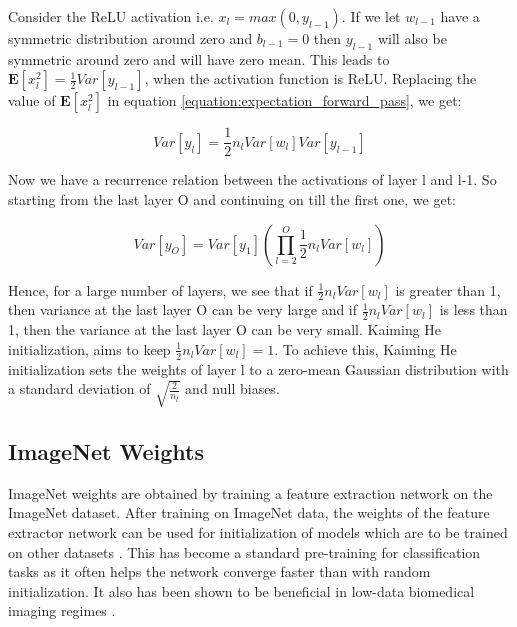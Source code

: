 Consider the ReLU activation i.e. $x_l = max(0, y_{l-1})$. If we let $w_{l-1}$ have a symmetric distribution around zero and $b_{l-1} = 0$ then $y_{l-1}$ will also be symmetric around zero and will have zero mean. This leads to $\mathbf{E}[x_l^2] = \frac{1}{2}Var[y_{l-1}]$, when the activation function is ReLU. Replacing the value of $\mathbf{E}[x_l^2]$ in equation \ref{equation:expectation_forward_pass}, we get:

\begin{equation}
    \label{equation:replaced_expectation_forward_pass}
    Var[y_l] = \frac{1}{2}n_l Var[w_l]Var[y_{l-1}]
\end{equation}

Now we have a recurrence relation between the activations of layer l and l-1. So starting from the last layer O and continuing on till the first one, we get:

\begin{equation}
    \label{equation:final_layers_forward_pass}
    Var[y_O] = Var[y_1] \left( \prod_{l=2}^{O} \frac{1}{2}n_l Var[w_l] \right)
\end{equation}

Hence, for a large number of layers, we see that if $\frac{1}{2}n_l Var[w_l]$ is greater than 1, then variance at the last layer O can be very large and if $\frac{1}{2}n_l Var[w_l]$ is less than 1, then the variance at the last layer O can be very small. Kaiming He initialization, aims to keep $\frac{1}{2}n_l Var[w_l] = 1$. To achieve this, Kaiming He initialization sets the weights of layer l to a zero-mean Gaussian distribution with a standard deviation of $\sqrt{\frac{2}{n_l}}$ and null biases.

\subsection{ImageNet Weights}
ImageNet weights are obtained by training a feature extraction network on the ImageNet dataset. After training on ImageNet data, the weights of the feature extractor network can be used for initialization of models which are to be trained on other datasets \cite{raghu2019}. This has become a standard pre-training for classification tasks as it often helps the network converge faster than with random initialization. It also has been shown to be beneficial in low-data biomedical imaging regimes \cite{raghu2019}. 

